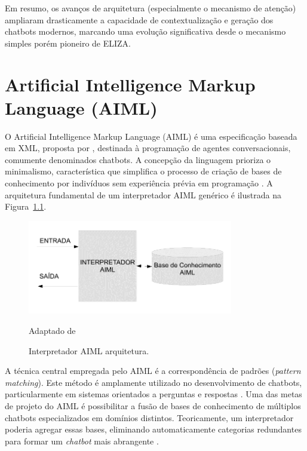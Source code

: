 \documentclass[14pt,a4paper,oneside]{book}
\begin{document}
Em resumo, os avanços de arquitetura (especialmente o mecanismo de atenção) ampliaram drasticamente a capacidade de contextualização e geração dos chatbots modernos, marcando uma evolução significativa desde o mecanismo simples porém pioneiro de ELIZA.



\chapter{Artificial Intelligence Markup
Language (AIML)}

O Artificial Intelligence Markup Language (AIML) é uma especificação baseada em XML, proposta por \cite{Wallace2009}, destinada à programação de agentes conversacionais, comumente denominados chatbots. A concepção da linguagem prioriza o minimalismo, característica que simplifica o processo de criação de bases de conhecimento por indivíduos sem experiência prévia em programação \cite{Wallace2009}. A arquitetura fundamental de um interpretador AIML genérico é ilustrada na Figura~\ref{fig:interpretador}.

\begin{figure}
    \centering
    \caption{Interpretador AIML arquitetura.}
    \includegraphics[width=0.8\textwidth]{./fig/image8} %
    \label{fig:interpretador}
    \vspace{0.2cm} %
    {\footnotesize 
	
	Adaptado de \cite{Silva2007}}
\end{figure}

A técnica central empregada pelo AIML é a correspondência de padrões (\emph{pattern matching}). Este método é amplamente utilizado no desenvolvimento de chatbots, particularmente em sistemas orientados a perguntas e respostas \cite{Abdul-Kader2015}. Uma das metas de projeto do AIML é possibilitar a fusão de bases de conhecimento de múltiplos chatbots especializados em domínios distintos. Teoricamente, um interpretador poderia agregar essas bases, eliminando automaticamente categorias redundantes para formar um \emph{chatbot} mais abrangente \cite{Wallace2000}.
\end{document}
